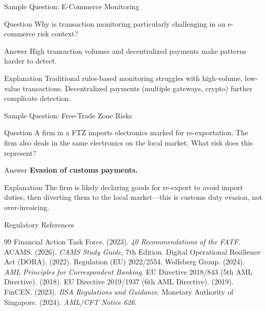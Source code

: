 \documentclass{beamer}
\begin{document}
	\begin{frame}{Sample Question: E-Commerce Monitoring}
		\begin{block}{Question}
			Why is transaction monitoring particularly challenging in an e-commerce risk context?
		\end{block}
		\begin{block}{Answer}
			High transaction volumes and decentralized payments make patterns harder to detect.
		\end{block}
		\begin{alertblock}{Explanation}
			Traditional rules-based monitoring struggles with high-volume, low-value transactions. Decentralized payments (multiple gateways, crypto) further complicate detection.
		\end{alertblock}
	\end{frame}
	
	\begin{frame}{Sample Question: Free-Trade Zone Risks}
		\begin{block}{Question}
			A firm in a FTZ imports electronics marked for re-exportation. The firm also deals in the same electronics on the local market. What risk does this represent?
		\end{block}
		\begin{block}{Answer}
			\textbf{Evasion of customs payments.}
		\end{block}
		\begin{alertblock}{Explanation}
			The firm is likely declaring goods for re-export to avoid import duties, then diverting them to the local market—this is customs duty evasion, not over-invoicing.
		\end{alertblock}
	\end{frame}
	
	\begin{frame}{Regulatory References}
		\begin{thebibliography}{99}
			 Financial Action Task Force. (2023). \textit{40 Recommendations of the FATF}.
			 ACAMS. (2026). \textit{CAMS Study Guide}, 7th Edition.
			 Digital Operational Resilience Act (DORA). (2022). Regulation (EU) 2022/2554.
			 Wolfsberg Group. (2024). \textit{AML Principles for Correspondent Banking}.
			 EU Directive 2018/843 (5th AML Directive). (2018).
			 EU Directive 2019/1937 (6th AML Directive). (2019).
			 FinCEN. (2023). \textit{BSA Regulations and Guidance}.
			 Monetary Authority of Singapore. (2024). \textit{AML/CFT Notice 626}.
		\end{thebibliography}
	\end{frame}
	
\end{document}
